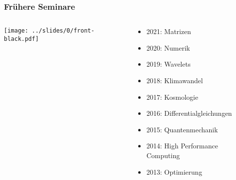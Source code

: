 %
%
%
\bgroup
\begin{frame}[t]
\setlength{\abovedisplayskip}{5pt}
\setlength{\belowdisplayskip}{5pt}
\frametitle{Frühere Seminare}
\vspace{-20pt}
\begin{columns}[t,onlytextwidth]
\begin{column}{0.48\textwidth}
\begin{center}
\texttt{[image: ../slides/0/front-black.pdf]}
\end{center}
\end{column}
\begin{column}{0.48\textwidth}
\begin{itemize}
\item 2021: Matrizen
\item 2020: Numerik
\item 2019: Wavelets
\item 2018: Klimawandel
\item 2017: Kosmologie
\item 2016: Differentialgleichungen
\item 2015: Quantenmechanik
\item 2014: High Performance Computing
\item 2013: Optimierung
\end{itemize}
\end{column}
\end{columns}
\end{frame}
\egroup
